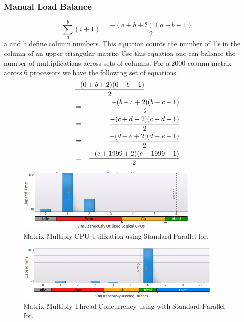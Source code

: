 \documentclass[journal,10pt,onecolumn]{IEEEtran}
\begin{document}
\subsubsection{Manual Load Balance}

\begin{equation}
\sum\limits_{a}^b (i + 1) = \frac{-(a + b + 2)(a - b -1)}{2}
\end{equation}
a and b define column numbers.  This equation counts the number of 1's in the 
column of an upper triangular matrix. Use this equation one can balance the number of 
multiplications across sets of columns.  For a 2000 column matrix across 6 processors 
we have the following set of equations.
\begin{eqnarray}
\lefteqn{\frac{-(0 + b + 2)(0 - b -1)}{2}} \\
& = & \frac{-(b + c + 2)(b - c -1)}{2} \\
& = & \frac{-(c + d + 2)(c - d -1)}{2} \\
& = & \frac{-(d + e + 2)(d - e -1)}{2} \\
& = & \frac{-(e + 1999 + 2)(e - 1999 -1)}{2}
\end{eqnarray}

\begin{figure}[!t]
\begin{center}
\includegraphics[width=0.8\textwidth]{figures/matrix_without_dynamic_schedule_cpu_usage.png}
\caption{Matrix Multiply CPU Utilization using Standard Parallel for.}
\label{fig:matrix_wo_dynamic_schedule_cpu_usage}
\end{center}
\end{figure}

\begin{figure}[!t]
\begin{center}
\includegraphics[width=0.9\textwidth]{figures/matrix_without_dynamic_schedule_thread_concurrency.png}
\caption{Matrix Multiply Thread Concurrency using with Standard Parallel for.}
\label{fig:matrix_wo_dynamic_schedule_concurrency}
\end{center}
\end{figure}
\end{document}
